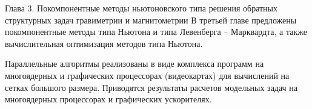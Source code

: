 \documentclass[10pt,pdf, mathserif, hyperref={unicode}]{beamer}
\begin{document}
%	
%		

\begin{frame}{Глава 3. Покомпонентные методы ньютоновского типа решения обратных структурных задач гравиметрии и магнитометрии}
	В третьей главе предложены покомпонентные методы типа Ньютона и типа Левенберга -- Марквардта, а также вычислительная оптимизация методов типа Ньютона. 
	
	Параллельные алгоритмы реализованы в виде комплекса программ на многоядерных и графических процессорах (видеокартах) для вычислений на сетках большого размера. Приводятся результаты расчетов модельных задач на многоядерных процессорах и графических ускорителях. 
	
\end{frame}
\end{document}
